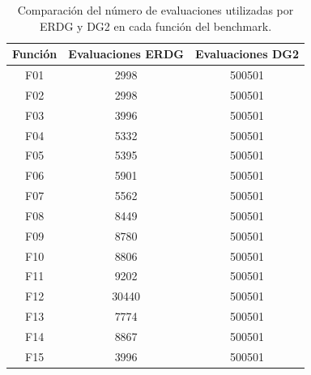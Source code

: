 \begin{table}[h]
\centering
\begin{tabular}{ccc}
\toprule
\textbf{Función} & \textbf{Evaluaciones ERDG} & \textbf{Evaluaciones DG2}\\
\midrule
F01  &  2998  &  500501 \\
F02  &  2998  &  500501 \\
F03  &  3996  &  500501 \\
F04  &  5332  &  500501 \\
F05  &  5395  &  500501 \\
F06  &  5901  &  500501 \\
F07  &  5562  &  500501 \\
F08  &  8449  &  500501 \\
F09  &  8780  &  500501 \\
F10 &  8806  &  500501 \\
F11 &  9202  &  500501 \\
F12 &  30440 &  500501 \\
F13 &  7774  &  500501 \\
F14 &  8867  &  500501 \\
F15 &  3996  &  500501 \\
\bottomrule
\end{tabular}
\caption{Comparación del número de evaluaciones utilizadas por ERDG y DG2 en cada función del benchmark.}
\label{tab:comparacion_agrupamiento}
\end{table}

